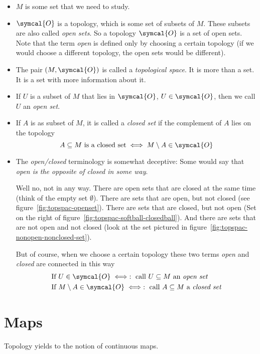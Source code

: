 \begin{itemize}
  \item $M$ is some set that we need to study.
  \item $\symcal{O}$ is a topology, which is some set of subsets of $M$. These subsets are also called
    \emph{open sets}. So a topology $\symcal{O}$ is a set of open sets. Note that the term \emph{open}
    is defined only by choosing a certain topology (if we would choose a different topology, the
    open sets would be different).
  \item The pair $(M, \symcal{O})$ is called a \emph{topological space}. It is more than a set. It
    is a set with more information about it.
  \item If $U$ is a subset of $M$ that lies in $\symcal{O}$, $U\in\symcal{O}$, then we call
    $U$ an \emph{open set}.
  \item If $A$ is as subset of $M$, it is called a \emph{closed set} if the complement of $A$
    lies on the topology
    \[
      A\subseteq M \text{ is a closed set} \iff  M\setminus A\in\symcal{O}
    \]
  \item The \emph{open/closed} terminology is somewhat deceptive:
    Some would say that \emph{open is the opposite of closed in some way}.

    Well no, not in any way.
    There are open sets that are closed at the same time (think of the empty set $\emptyset$).
    There are sets that are open, but not closed (see figure~\ref{fig:topspac-openset}).
    There are sets that are closed, but not open (Set on the right of
    figure~\ref{fig:topspac-softball-closedball}).
    And there are sets that are not open and not closed (look at the set pictured in
    figure~\ref{fig:topspac-nonopen-nonclosed-set}).

    But of course, when we choose a certain topology these two terms \emph{open} and \emph{closed} are
    connected in this way
    \begin{align*}
      & \text{If } U\in\symcal{O}
        \iff : \text{ call } U\subseteq M \text{ an \emph{open set}}\\
      & \text{If } M\setminus A\in\symcal{O}
        \iff : \text{ call } A\subseteq M \text{ a \emph{closed set}}
    \end{align*}
    
  \end{itemize}
  
  \section{Maps}
  Topology yields to the notion of continuous maps.
